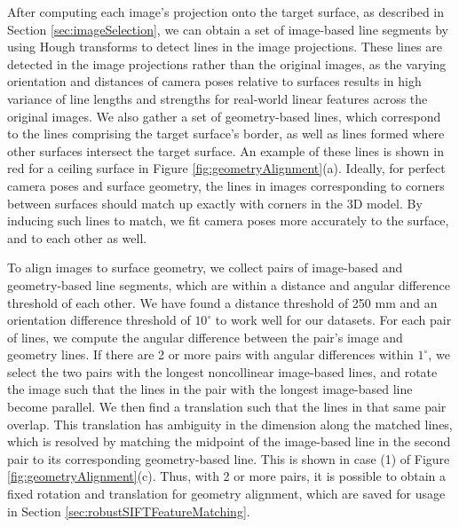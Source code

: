 \documentclass[]{spie}  %
\begin{document}
After computing each image's projection onto the target surface, as
described in Section \ref{sec:imageSelection}, we can obtain a set of
image-based line segments by using Hough transforms to detect lines in
the image projections. These lines are detected in the image
projections rather than the original images, as the varying
orientation and distances of camera poses relative to surfaces results
in high variance of line lengths and strengths for real-world linear
features across the original images. We also gather a set of
geometry-based lines, which correspond to the lines comprising the
target surface's border, as well as lines formed where other surfaces
intersect the target surface. An example of these lines is shown in
red for a ceiling surface in Figure
\ref{fig:geometryAlignment}(a). Ideally, for perfect camera poses and
surface geometry, the lines in images corresponding to corners between
surfaces should match up exactly with corners in the 3D model. By
inducing such lines to match, we fit camera poses more accurately to
the surface, and to each other as well.

To align images to surface geometry, we collect pairs of image-based
and geometry-based line segments, which are within a distance and
angular difference threshold of each other. We have found a distance
threshold of 250 mm and an orientation difference threshold of
$10^\circ$ to work well for our datasets. For each pair of lines, we
compute the angular difference between the pair's image and geometry
lines. If there are 2 or more pairs with angular differences within
$1^\circ$, we select the two pairs with the longest noncollinear
image-based lines, and rotate the image such that the lines in the
pair with the longest image-based line become parallel. We then find a
translation such that the lines in that same pair overlap. This
translation has ambiguity in the dimension along the matched lines,
which is resolved by matching the midpoint of the image-based line in
the second pair to its corresponding geometry-based line. This is
shown in case (1) of Figure \ref{fig:geometryAlignment}(c). Thus, with
2 or more pairs, it is possible to obtain a fixed rotation and
translation for geometry alignment, which are saved for usage in
Section \ref{sec:robustSIFTFeatureMatching}.
\end{document}
